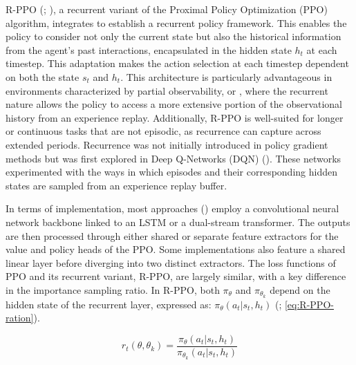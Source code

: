 \noindent R-PPO (\textcolor{deepblue}{\cite{pleines2022generalization}; \cite{stable-baselines3}}), a recurrent variant of the Proximal Policy Optimization (PPO) algorithm, integrates  to establish a recurrent policy framework. This enables the policy to consider not only the current state but also the historical information from the agent’s past interactions, encapsulated in the hidden state $h_t$ at each timestep. This adaptation makes the action selection at each timestep dependent on both the state $s_t$ and $h_t$. This architecture is particularly advantageous in environments characterized by partial observability, or , where the recurrent nature allows the policy to access a more extensive portion of the observational history from an experience replay. Additionally, R-PPO is well-suited for longer or continuous tasks that are not episodic, as recurrence can capture  across extended periods. Recurrence was not initially introduced in policy gradient methods but was first explored in Deep Q-Networks (DQN) (\textcolor{deepblue}{\cite{andrychowicz2021what}}). These networks experimented with the ways in which episodes and their corresponding hidden states are sampled from an experience replay buffer.

\bigskip

\noindent In terms of implementation, most approaches (\textcolor{deepblue}{\cite{shengyi2022the37implementation}}) employ a convolutional neural network backbone linked to an LSTM or a dual-stream transformer. The outputs are then processed through either shared or separate feature extractors for the value and policy heads of the PPO. Some implementations also feature a shared linear layer before diverging into two distinct extractors. The loss functions of PPO and its recurrent variant, R-PPO, are largely similar, with a key difference in the importance sampling ratio. In R-PPO, both $\pi_{\theta}$ and $\pi_{\theta_k}$ depend on the hidden state of the recurrent layer, expressed as: $\pi_{\theta}(a_t | s_t, h_t)$ (\textcolor{deepblue}{\cite{pleines2022generalization}; \autoref{eq:R-PPO-ration}}).

\begin{equation}
    r_t(\theta, \theta_k) = \frac{\pi_{\theta}(a_t | s_t, h_t)}{\pi_{\theta_k}(a_t | s_t, h_t)}
    \label{eq:R-PPO-ration}
\end{equation}

